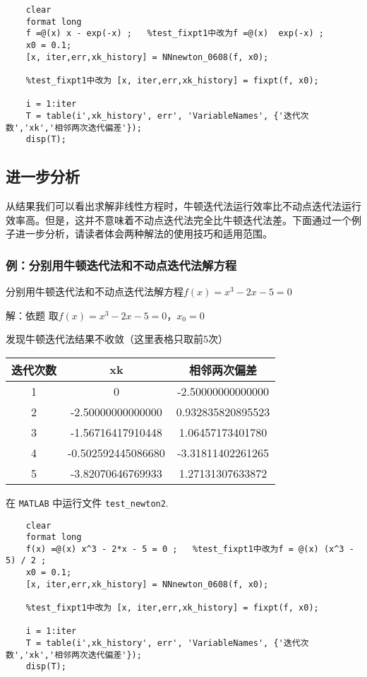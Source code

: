 \documentclass[12pt, a4paper, oneside]{ctexart}
\begin{document}
\begin{lstlisting}
	clear
	format long
	f =@(x) x - exp(-x) ;   %test_fixpt1中改为f =@(x)  exp(-x) ;
	x0 = 0.1;
	[x, iter,err,xk_history] = NNnewton_0608(f, x0);  
	
	%test_fixpt1中改为 [x, iter,err,xk_history] = fixpt(f, x0);
	
	i = 1:iter
	T = table(i',xk_history', err', 'VariableNames', {'迭代次数','xk','相邻两次迭代偏差'});
	disp(T);
\end{lstlisting}

	\subsection{进一步分析}
	
	\noindent
	从结果我们可以看出求解非线性方程时，牛顿迭代法运行效率比不动点迭代法运行效率高。但是，这并不意味着不动点迭代法完全比牛顿迭代法差。下面通过一个例子进一步分析，请读者体会两种解法的使用技巧和适用范围。
	\subsubsection{例：分别用牛顿迭代法和不动点迭代法解方程}
分别用牛顿迭代法和不动点迭代法解方程$f(x) = x^3 - 2x - 5 = 0$

解：依题 取$f(x) = x^3 - 2x - 5 = 0$，$x_0=0$

发现牛顿迭代法结果不收敛（这里表格只取前5次）
\begin{table}[h]
	\centering
	\begin{tabular}{c|c|c}
		\hline
		迭代次数 & xk                 & 相邻两次偏差            \\ \hline
		1    & 0                  & -2.50000000000000 \\
		2    & -2.50000000000000  & 0.932835820895523 \\
		3    & -1.56716417910448  & 1.06457173401780  \\
		4    & -0.502592445086680 & -3.31811402261265 \\
		5    & -3.82070646769933  & 1.27131307633872  \\ \hline
	\end{tabular}
\end{table}

\vspace{1em}

\vspace{1em}
在 \texttt{MATLAB} 中运行文件 \texttt{test\_newton2}.

\begin{lstlisting}
	clear
	format long
	f(x) =@(x) x^3 - 2*x - 5 = 0 ;   %test_fixpt1中改为f = @(x) (x^3 - 5) / 2 ;
	x0 = 0.1;
	[x, iter,err,xk_history] = NNnewton_0608(f, x0);  
	
	%test_fixpt1中改为 [x, iter,err,xk_history] = fixpt(f, x0);
	
	i = 1:iter
	T = table(i',xk_history', err', 'VariableNames', {'迭代次数','xk','相邻两次迭代偏差'});
	disp(T);
\end{lstlisting}
\end{document}
